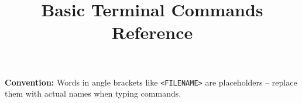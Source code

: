 \documentclass[10pt, a4paper, landscape]{article}
\title{\Large Basic Terminal Commands Reference}
\author{}
\date{}
\begin{document}
\maketitle
\vspace{-12mm}

\begin{center}
\begin{tcolorbox}[
    colback=gray!10,
    colframe=gray!50,
    boxrule=0.5pt,
    width=\textwidth,
    arc=0.5mm,
    boxsep=1mm,
    fontupper=\footnotesize
]
\textbf{Convention:} Words in angle brackets like \colorbox{gray!20}{\texttt{<FILENAME>}} are placeholders -- replace them with actual names when typing commands.
\end{tcolorbox}
\end{center}

\vspace{-3mm}
\end{document}
